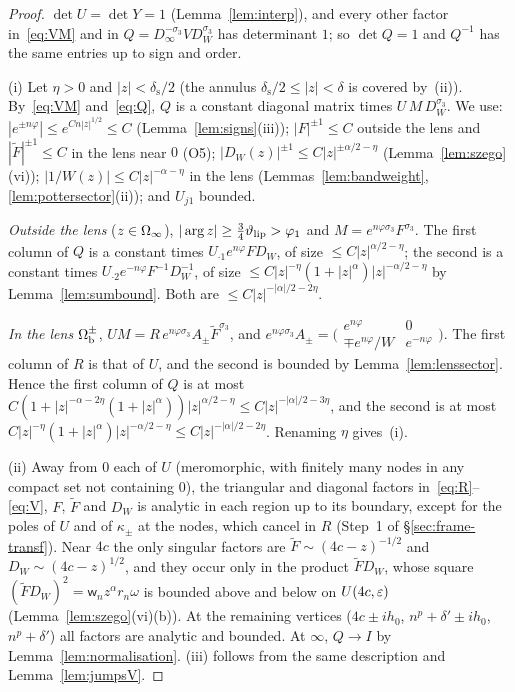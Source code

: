 \begin{proof}
$\det U=\det Y=1$ (Lemma~\ref{lem:interp}), and every other factor in~\eqref{eq:VM} and in $Q=D_\infty^{-\sigma_3}VD_W^{\sigma_3}$ has
determinant $1$; so $\det Q=1$ and $Q^{-1}$ has the same entries up to sign and order.

(i) Let $\eta>0$ and $|z|<\delta_{\mathrm s}/2$ (the annulus $\delta_{\mathrm s}/2\le|z|<\delta$ is covered by~(ii)). By~\eqref{eq:VM} and~\eqref{eq:Q},
$Q$ is a constant diagonal matrix times $U\,M\,D_W^{\sigma_3}$. We use: $|e^{\pm n\varphi}|\le e^{Cn|z|^{1/2}}\le C$ (Lemma~\ref{lem:signs}(iii)); $|F|^{\pm1}\le C$ outside
the lens and $|\tilde F|^{\pm1}\le C$ in the lens near $0$ (O5); $|D_W(z)|^{\pm1}\le C|z|^{\pm\alpha/2-\eta}$
(Lemma~\ref{lem:szego}(vi)); $|1/W(z)|\le C|z|^{-\alpha-\eta}$ in the lens (Lemmas~\ref{lem:bandweight},
\ref{lem:pottersector}(ii)); and $U_{j1}$ bounded.

\emph{Outside the lens} ($z\in\Omega_{\infty}$), $|\arg z|\ge\frac34\vartheta_{\mathrm{lip}}>\varphi_1$ and $M=e^{n\varphi\sigma_3}F^{\sigma_3}$. The first column of
$Q$ is a constant times $U_{\cdot1}e^{n\varphi}FD_W$, of size $\le C|z|^{\alpha/2-\eta}$; the second is a constant times
$U_{\cdot2}e^{-n\varphi}F^{-1}D_W^{-1}$, of size $\le C|z|^{-\eta}(1+|z|^\alpha)|z|^{-\alpha/2-\eta}$ by Lemma~\ref{lem:sumbound}. Both are
$\le C|z|^{-|\alpha|/2-2\eta}$.

\emph{In the lens} $\Omega_{\mathrm{b}}^\pm$, $UM=R\,e^{n\varphi\sigma_3}A_\pm\tilde F^{\sigma_3}$, and
$e^{n\varphi\sigma_3}A_\pm=\bigl(\begin{smallmatrix}e^{n\varphi}&0\\\mp e^{n\varphi}/W&e^{-n\varphi}\end{smallmatrix}\bigr)$. The first column of
$R$ is that of $U$, and the second is bounded by Lemma~\ref{lem:lenssector}. Hence the first column of $Q$ is at most
$C(1+|z|^{-\alpha-2\eta}(1+|z|^\alpha))|z|^{\alpha/2-\eta}\le C|z|^{-|\alpha|/2-3\eta}$, and the second is at most
$C|z|^{-\eta}(1+|z|^\alpha)|z|^{-\alpha/2-\eta}\le C|z|^{-|\alpha|/2-2\eta}$. Renaming $\eta$ gives~(i).

(ii) Away from $0$ each of $U$ (meromorphic, with finitely many nodes in any compact set not containing $0$), the triangular
and diagonal factors in~\eqref{eq:R}--\eqref{eq:V}, $F$, $\tilde F$ and $D_W$ is analytic in each region up to its boundary, except
for the poles of $U$ and of $\kappa_\pm$ at the nodes, which cancel in $R$ (Step~1 of \S\ref{sec:frame-transf}). Near $4c$ the
only singular factors are $\tilde F\sim(4c-z)^{-1/2}$ and $D_W\sim(4c-z)^{1/2}$, and they occur only in the product
$\tilde FD_W$, whose square $(\tilde FD_W)^2=\mathsf w_nz^\alpha r_n\omega$ is bounded above and below on $U(4c,\varepsilon)$
(Lemma~\ref{lem:szego}(vi)(b)). At the remaining vertices ($4c\pm ih_0$, $n^p+\delta'\pm ih_0$, $n^p+\delta'$) all factors are
analytic and bounded. At $\infty$, $Q\to I$ by Lemma~\ref{lem:normalisation}. (iii) follows from the same description and
Lemma~\ref{lem:jumpsV}.
\end{proof}

